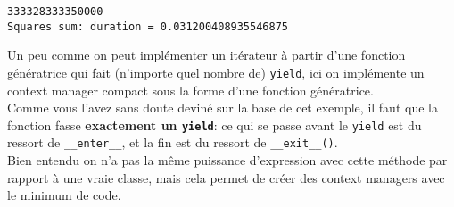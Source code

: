     \begin{Verbatim}[commandchars=\\\{\}]
333328333350000
Squares sum: duration = 0.031200408935546875

    \end{Verbatim}

    Un peu comme on peut implémenter un itérateur à partir d'une fonction
génératrice qui fait (n'importe quel nombre de) \texttt{yield}, ici on
implémente un context manager compact sous la forme d'une fonction
génératrice.\\

Comme vous l'avez sans doute deviné sur la base de cet exemple, il faut
que la fonction fasse \textbf{exactement un \texttt{yield}}: ce qui se
passe avant le \texttt{yield} est du ressort de \texttt{\_\_enter\_\_},
et la fin est du ressort de \texttt{\_\_exit\_\_()}.\\

Bien entendu on n'a pas la même puissance d'expression avec cette
méthode par rapport à une vraie classe, mais cela permet de créer des
context managers avec le minimum de code.
